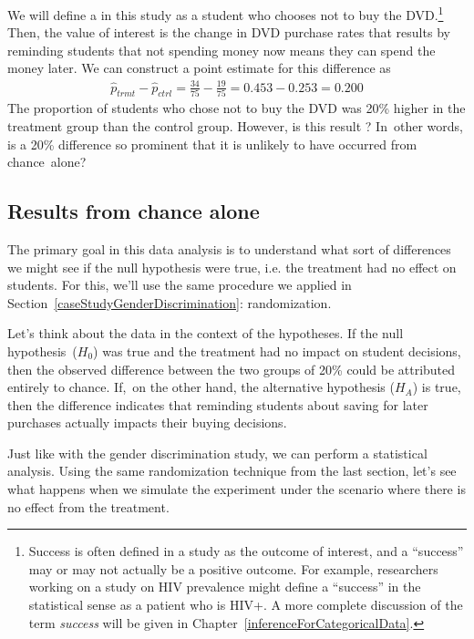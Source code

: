 We will define a  in this study as a student who chooses not to buy the DVD.\footnote{Success is often defined in a study as the outcome of interest, and a ``success'' may or may not actually be a positive outcome. For example, researchers working on a study on HIV prevalence might define a ``success'' in the statistical sense as a patient who is HIV+. A more complete discussion of the term \emph{success} will be given in Chapter~\ref{inferenceForCategoricalData}. } Then, the value of interest is the change in DVD purchase rates that results by reminding students that not spending money now means they can spend the money later.
We can construct a point estimate for this difference as
\begin{align*}
\hat{p}_{trmt} - \hat{p}_{ctrl}
  = \frac{34}{75} - \frac{19}{75}
  = 0.453 - 0.253
  = 0.200
\end{align*}
The proportion of students who chose not to buy the DVD was 20\% higher in the treatment group than the control group.
However, is this result ? In~other words, is a 20\% difference so prominent that it is unlikely to have occurred from chance~alone?

\subsection{Results from chance alone}

The primary goal in this data analysis is to understand what sort of differences we might see if the null hypothesis were true, i.e. the treatment had no effect on students. For this, we'll use the same procedure we applied in Section~\ref{caseStudyGenderDiscrimination}: randomization.

Let's think about the data in the context of the hypotheses. If the null  hypothesis~($H_0$) was true and the treatment had no impact on student decisions, then the observed difference between the two groups of 20\% could be attributed entirely to chance. If,~on the other hand, the alternative hypothesis ($H_A$) is true, then the difference indicates that reminding students about saving for later purchases actually impacts their buying decisions.

Just like with the gender discrimination study, we can perform a statistical analysis. Using the same randomization technique from the last section, let's see what happens when we simulate the experiment under the scenario where there is no effect from the treatment.

